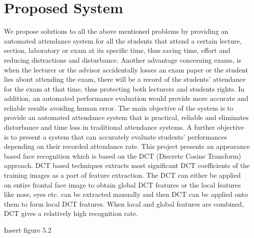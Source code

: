 \section{Proposed System}
We propose solutions to all the above mentioned problems by providing an automated attendance system for all the students that attend a certain lecture, section, laboratory or exam at its specific time, thus saving time, effort and reducing distractions and disturbance. Another advantage concerning exams, is when the lecturer or the advisor accidentally losses an exam paper or the student lies about attending the exam, there will be a record of the students’ attendance for the exam at that time, thus protecting both lecturers and students rights. In addition, an automated performance evaluation would provide more accurate and reliable results avoiding human error.
The main objective of the system is to provide an automated attendance system that is practical, reliable and eliminates disturbance and time loss in traditional attendance systems. A further objective is to present a system that can accurately evaluate students’ performances depending on their recorded attendance rate.
This project presents an appearance based face recognition which is based on the DCT (Discrete Cosine Transform) approach. DCT based techniques extracts most significant DCT coefficients of the training images as a part of feature extraction. The DCT can either be applied on entire frontal face image to obtain global DCT features or the local features like nose, eyes etc. can be extracted manually and then DCT can be applied onto them to form local DCT features. When local and global features are combined, DCT gives a relatively high recognition rate.

Insert figure 5.2
